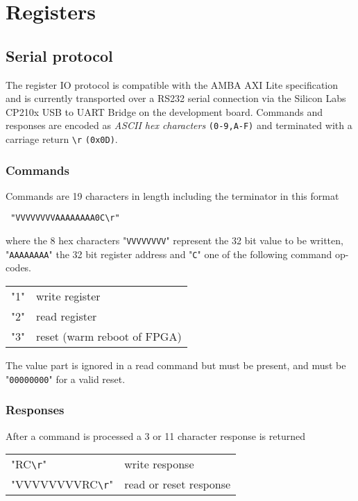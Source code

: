 \documentclass{article}
\newcommand{\code}[1]{\texttt{#1}}
\newenvironment{fielddesc}
{\texttt\bgroup}
{\egroup}
\newcommand{\return}{\code{\textbackslash r}}
\begin{document}
\section{Registers}

\subsection{Serial protocol}

The register IO protocol is compatible with the AMBA AXI Lite specification and
is currently transported over a RS232 serial connection via the Silicon Labs
CP210x USB to UART Bridge on the development board.
Commands and responses are encoded as \emph{ASCII hex characters}
\code{(0-9,A-F)} and terminated with a carriage return \return{} \code{(0x0D)}.

\subsubsection{Commands}

Commands are 19 characters in length including the terminator in this format

\begin{fielddesc}
"VVVVVVVVAAAAAAAA0C\return" 
\end{fielddesc}

where the 8 hex characters "\code{VVVVVVVV}" represent the 32 bit value to be
written, "\code{AAAAAAAA}" the 32 bit register address and "\code{C}" one of the
following command op-codes.

\begin{fielddesc}
\begin{tabular}{l l}
"1" & write register \\
"2" & read register \\
"3" & reset (warm reboot of FPGA)
\end{tabular}
\end{fielddesc} 

The value part is ignored in a read command but must be present, and must be
"\code{00000000}" for a valid reset.

\subsubsection{Responses}

After a command is processed a 3 or 11 character response is returned

\begin{fielddesc}
\begin{tabular}{l l}
"RC\return"                  & write response \\
"VVVVVVVVRC\return"          & read or reset response \\
\end{tabular}
\end{fielddesc}
\end{document}
